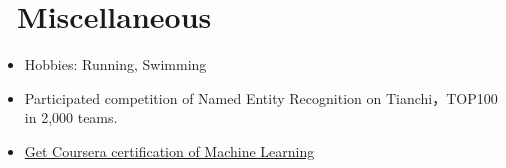 \documentclass{resume}
\begin{document}



\section{\faInfo\  Miscellaneous}\normalsize
\begin{itemize}
\item {Hobbies: Running, Swimming}
\item{Participated competition of Named Entity Recognition on Tianchi，TOP100 in 2,000 teams.}
\item {\href{https://www.coursera.org/account/accomplishments/verify/NFCZEBTZ5T4L}{Get Coursera certification of Machine Learning} }
\end{itemize}

%
%
\end{document}
